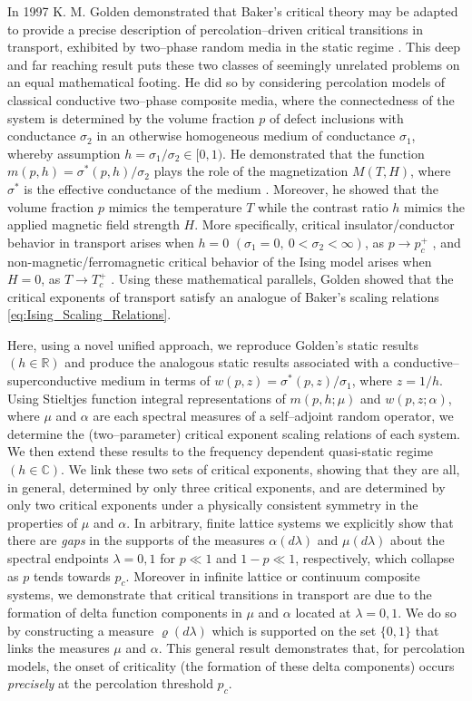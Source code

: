 \documentclass[english,12pt,jmp,graphicx]{revtex4-1}
\begin{document}
In 1997 K. M. Golden demonstrated that Baker's critical theory may be
adapted to provide a precise description of percolation--driven
critical transitions in transport, exhibited by two--phase random
media in the static regime \cite{Golden:PRL-3935}. This deep and far
reaching result puts these two classes of seemingly unrelated problems
on an equal mathematical footing. He did so by considering percolation
models of classical conductive two--phase composite media, where the
connectedness of the system is determined by the volume fraction $p$
of defect inclusions with conductance $\sigma_2$ in an otherwise
homogeneous medium of conductance $\sigma_1$, whereby assumption $h=\sigma_1/\sigma_2\in[0,1)$.
He demonstrated that the function $m(p,h)=\sigma^*(p,h)/\sigma_2$ plays the role
of the magnetization  $M(T,H)$, where $\sigma^*$ is the effective
conductance of the medium
\cite{Bergman:PRC-377,Milton:APL-300,Golden:CMP-473}. Moreover, he 
showed that the volume fraction $p$ mimics the temperature $T$ while
the contrast ratio $h$ mimics the applied magnetic field strength $H$. More
specifically, critical insulator/conductor behavior in transport
arises when $h=0$ $(\sigma_1=0, \ 0<\sigma_2<\infty)$, as $p\to p_c^+$
\cite{Golden:PRL-3935}, and non-magnetic/ferromagnetic
critical behavior of the Ising model arises when $H=0$, as $T\to T_c^+$
\cite{Christensen-2005}. Using these mathematical
parallels, Golden showed that the critical exponents of transport
satisfy an analogue of Baker's %
scaling relations \eqref{eq:Ising_Scaling_Relations}.

Here, using a novel unified approach, we reproduce Golden's
static results $(h\in\mathbb{R})$ and produce the analogous
static results associated with a conductive--superconductive medium in
terms of $w(p,z)=\sigma^*(p,z)/\sigma_1$, where $z=1/h$. Using Stieltjes
function integral representations of $m(p,h;\mu)$ and $w(p,z;\alpha)$, where
$\mu$ and $\alpha$ are each spectral measures of a self--adjoint random operator, we
determine the (two--parameter) critical exponent scaling relations of each
system. We then extend these results to the frequency dependent
quasi-static regime $(h\in\mathbb{C})$. We link these two sets of
critical exponents, showing that they are all, in general, determined
by only three critical exponents, and are determined by only two
critical exponents under a physically consistent symmetry in the
properties of $\mu$ and $\alpha$. In arbitrary, finite lattice systems we
explicitly show that there are \emph{gaps} in the supports of the measures
$\alpha(d\lambda)$ and $\mu(d\lambda)$ about the spectral endpoints $\lambda=0,1$ for $p\ll1$ and
$1-p\ll1$, respectively, which collapse as $p$ tends towards
$p_c$. Moreover in infinite lattice or continuum composite systems, we
demonstrate that critical transitions in transport are due to the
formation of delta function components in $\mu$ and $\alpha$ located at
$\lambda=0,1$. We do so by constructing a measure $\varrho(d\lambda)$ which is supported
on the set $\{0,1\}$ that links the measures $\mu$ and $\alpha$. This general
result demonstrates that, for percolation models, the onset of
criticality (the formation of these delta components) occurs
\emph{precisely} at the percolation threshold $p_c$.  
%
%
\end{document}
